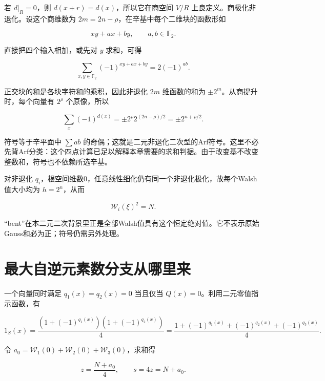 \documentclass[UTF8,fontset=fandol,zihao=-4,openany,oneside]{ctexbook}
\begin{document}
若 \(d|_R=0\)，则 \(d(x+r)=d(x)\)，所以它在商空间 \(V/R\) 上良定义。商极化非退化。设这个商维数为 \(2m=2n-\rho\)，在辛基中每个二维块的函数形如



\[
xy+ax+by,\qquad a,b\in\mathbb F_2.
\]



直接把四个输入相加，或先对 \(y\) 求和，可得



\[
\sum_{x,y\in\mathbb F_2}(-1)^{xy+ax+by}=2(-1)^{ab}.
\]



正交块的和是各块字符和的乘积，因此非退化 \(2m\) 维函数的和为 \(\pm2^m\)。从商提升时，每个向量有 \(2^\rho\) 个原像，所以



\[
\sum_x(-1)^{d(x)}=\pm2^\rho2^{(2n-\rho)/2}
=\pm2^{n+\rho/2}.
\]



符号等于辛平面中 \(\sum ab\) 的奇偶；这就是二元非退化二次型的Arf符号。这里不必先背Arf分类：这个四点计算已足以解释本章需要的求和判据。由于改变基不改变整数和，符号也不依赖所选辛基。



对非退化 \(q_i\)，根空间维数0，任意线性细化仍有同一个非退化极化，故每个Walsh值大小均为 \(h=2^n\)，从而



\[
\mathcal W_i(\xi)^2=N.
\]



“bent”在本二元二次背景里正是全部Walsh值具有这个恒定绝对值。它不表示原始Gauss和必为正；符号仍需另外处理。



\section{最大自逆元素数分支从哪里来}


一个向量同时满足 \(q_1(x)=q_2(x)=0\) 当且仅当 \(Q(x)=0\)。利用二元零值指示函数，有



\[
1_S(x)=\frac{(1+(-1)^{q_1(x)})(1+(-1)^{q_2(x)})}{4}
=\frac{1+(-1)^{q_1(x)}+(-1)^{q_2(x)}+(-1)^{q_3(x)}}4.
\]



令 \(a_0=\mathcal W_1(0)+\mathcal W_2(0)+\mathcal W_3(0)\)，求和得



\[
z=\frac{N+a_0}{4},\qquad s=4z=N+a_0.
\]
\end{document}
